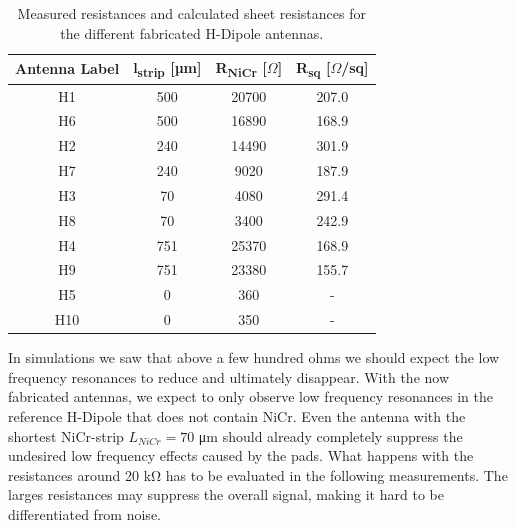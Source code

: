 \begin{table}[ht]
    \centering
    \begin{tabular}{|c|c|c|c|}
        \hline
        \textbf{Antenna Label} & \textbf{l\textsubscript{strip} [µm]} & \textbf{R\textsubscript{NiCr} [$\Omega$]} & \textbf{R\textsubscript{sq} [$\Omega$/sq]} \\ \hline
        H1 & 500 & 20700 & 207.0 \\ \hline
        H6 & 500 & 16890 & 168.9 \\ \hline
        H2 & 240 & 14490 & 301.9 \\ \hline
        H7 & 240 & 9020 & 187.9 \\ \hline
        H3 & 70 & 4080 & 291.4 \\ \hline
        H8 & 70 & 3400 & 242.9 \\ \hline
        H4 & 751 & 25370 & 168.9 \\ \hline
        H9 & 751 & 23380 & 155.7 \\ \hline
        H5 & 0 & 360 & - \\ \hline
        H10 & 0 & 350 & - \\ \hline
    \end{tabular}
    \caption{Measured resistances and calculated sheet resistances for the different fabricated H-Dipole antennas.}
    \label{table:1}
\end{table}

In simulations we saw that above a few hundred ohms we should expect the low frequency resonances to reduce and ultimately disappear. With the now fabricated antennas, we expect to only observe low frequency resonances in the reference H-Dipole that does not contain NiCr. Even the antenna with the shortest NiCr-strip $L_{NiCr} = 70$ \si{\micro \meter} should already completely suppress the undesired low frequency effects caused by the pads. What happens with the resistances around \num{20} \si{\kilo \ohm} has to be evaluated in the following measurements. The larges resistances may suppress the overall signal, making it hard to be differentiated from noise. 




